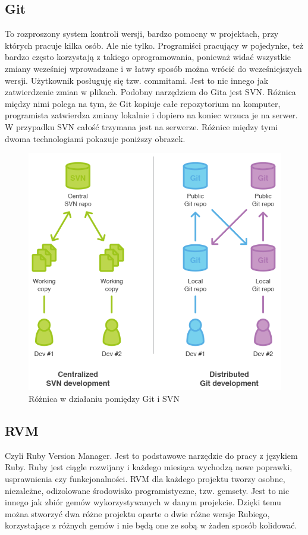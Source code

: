   \subsection{Git}
  To rozproszony system kontroli wersji, bardzo pomocny w projektach, przy których pracuje kilka osób. Ale nie tylko. Programiści pracujący w pojedynke, też bardzo często korzystają z takiego oprogramowania, ponieważ widać wszystkie zmiany wcześniej wprowadzane i w łatwy sposób można wrócić do wcześniejszych wersji. Użytkownik posługuję się tzw. commitami. Jest to nic innego jak zatwierdzenie zmian w plikach. Podobny narzędziem do Gita jest SVN. Różnica między nimi polega na tym, że Git kopiuje całe repozytorium na komputer, programista zatwierdza zmiany lokalnie i dopiero na koniec wrzuca je na serwer. W przypadku SVN całość trzymana jest na serwerze. Różnice między tymi dwoma technologiami pokazuje poniższy obrazek.

  \begin{figure}[h]
    \centering
    \includegraphics[scale=0.47]{images/gitsvn.png}
    \caption{Różnica w działaniu pomiędzy Git i SVN}
  \end{figure}

  \subsection{RVM}
  Czyli Ruby Version Manager. Jest to podstawowe narzędzie do pracy z językiem Ruby. Ruby jest ciągle rozwijany i każdego miesiąca wychodzą nowe poprawki, usprawnienia czy funkcjonalności. RVM dla każdego projektu tworzy osobne, niezależne, odizolowane środowisko programistyczne, tzw. gemsety. Jest to nic innego jak zbiór gemów wykorzystywanych w danym projekcie. Dzięki temu można stworzyć dwa różne projektu oparte o dwie różne wersje Rubiego, korzystające z różnych gemów i nie będą one ze sobą w żaden sposób kolidować.


